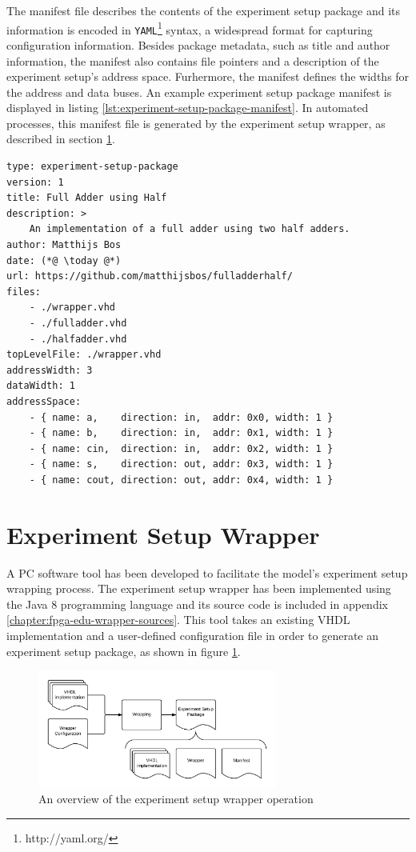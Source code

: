 \documentclass[main.tex]{subfiles}
\begin{document}
The manifest file describes the contents of the experiment setup package and its information is encoded in \texttt{YAML}\footnote{http://yaml.org/} syntax, a widespread format for capturing configuration information. Besides package metadata, such as title and author information, the manifest also contains file pointers and a description of the experiment setup's address space. Furhermore, the manifest defines the widths for the address and data buses. An example experiment setup package manifest is displayed in listing \ref{lst:experiment-setup-package-manifest}. In automated processes, this manifest file is generated by the experiment setup wrapper, as described in section \ref{section:experiment_setup_wrapper}.

\begin{lstlisting}[caption={Example experiment setup package \texttt{manifest.yaml}}, label={lst:experiment-setup-package-manifest}]
type: experiment-setup-package
version: 1
title: Full Adder using Half
description: >
    An implementation of a full adder using two half adders.
author: Matthijs Bos
date: (*@ \today @*)
url: https://github.com/matthijsbos/fulladderhalf/
files: 
    - ./wrapper.vhd
    - ./fulladder.vhd
    - ./halfadder.vhd
topLevelFile: ./wrapper.vhd
addressWidth: 3
dataWidth: 1
addressSpace:
    - { name: a,    direction: in,  addr: 0x0, width: 1 }
    - { name: b,    direction: in,  addr: 0x1, width: 1 }
    - { name: cin,  direction: in,  addr: 0x2, width: 1 }
    - { name: s,    direction: out, addr: 0x3, width: 1 }
    - { name: cout, direction: out, addr: 0x4, width: 1 }
\end{lstlisting}






\section{Experiment Setup Wrapper}
\label{section:experiment_setup_wrapper}
A PC software tool has been developed to facilitate the model's experiment setup wrapping process. The experiment setup wrapper has been implemented using the Java 8 programming language and its source code is included in appendix \ref{chapter:fpga-edu-wrapper-sources}. This tool takes an existing VHDL implementation and a user-defined configuration file in order to generate an experiment setup package, as shown in figure \ref{fig:wrapper-overview}. 

\begin{figure}[h]
    \centering
    \caption{An overview of the experiment setup wrapper operation}
    \label{fig:wrapper-overview}
    \includegraphics[width=0.7\textwidth]{img/wrapper}
\end{figure}
\end{document}
